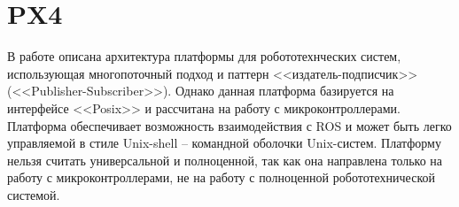 \section{PX4}

В работе \cite{meier2015px4} описана архитектура платформы для робототехнческих 
систем, использующая многопоточный подход и паттерн <<издатель-подписчик>> 
(<<Publisher-Subscriber>>). Однако данная платформа базируется на интерфейсе 
<<Posix>> и рассчитана на работу с микроконтроллерами. Платформа обеспечивает 
возможность взаимодействия с ROS и может быть легко управляемой в стиле 
Unix-shell – командной оболочки Unix-систем. Платформу нельзя считать 
универсальной и полноценной, так как она направлена только на работу с 
микроконтроллерами, не на работу с полноценной робототехнической системой.